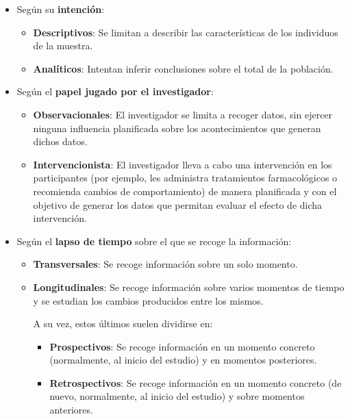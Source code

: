 \documentclass[
  spanish,
  letterpaper,
  DIV=11,
  numbers=noendperiod]{scrreprt}
\begin{document}
\begin{itemize}
\item
  Según su \textbf{intención}:

  \begin{itemize}
  \item
    \textbf{Descriptivos}: Se limitan a describir las características de
    los individuos de la muestra.
  \item
    \textbf{Analíticos}: Intentan inferir conclusiones sobre el total de
    la población.
  \end{itemize}
\item
  Según el \textbf{papel jugado por el investigador}:

  \begin{itemize}
  \item
    \textbf{Observacionales}: El investigador se limita a recoger datos,
    sin ejercer ninguna influencia planificada sobre los acontecimientos
    que generan dichos datos.
  \item
    \textbf{Intervencionista}: El investigador lleva a cabo una
    intervención en los participantes (por ejemplo, les administra
    tratamientos farmacológicos o recomienda cambios de comportamiento)
    de manera planificada y con el objetivo de generar los datos que
    permitan evaluar el efecto de dicha intervención.
  \end{itemize}
\item
  Según el \textbf{lapso de tiempo} sobre el que se recoge la
  información:

  \begin{itemize}
  \item
    \textbf{Transversales}: Se recoge información sobre un solo momento.
  \item
    \textbf{Longitudinales}: Se recoge información sobre varios momentos
    de tiempo y se estudian los cambios producidos entre los mismos.

    A su vez, estos últimos suelen dividirse en:

    \begin{itemize}
    \item
      \textbf{Prospectivos}: Se recoge información en un momento
      concreto (normalmente, al inicio del estudio) y en momentos
      posteriores.
    \item
      \textbf{Retrospectivos}: Se recoge información en un momento
      concreto (de nuevo, normalmente, al inicio del estudio) y sobre
      momentos anteriores.
    \end{itemize}
  \end{itemize}
\end{itemize}
\end{document}
